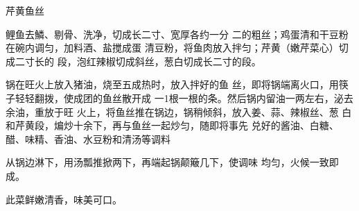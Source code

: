 \begin{recipe}{芹黄鱼丝}

\ingredients


\cooking

\step 	鲤鱼去鱗、剔骨、洗净，切成长二寸、宽厚各约一分 二的粗丝；鸡蛋清和干豆粉在碗内调匀，加料酒、盐搅成蛋 清豆粉，将鱼肉放入拌匀；芹黄（嫩芹菜心）切成二寸长的 段，泡红辣椒切成斜丝，葱白切成长二寸的段。

\step 	锅在旺火上放入猪油，烧至五成热时，放入拌好的鱼 丝，即将锅端离火口，用筷子轻轻翻拨，使成团的鱼丝散开成 一1根一根的条。然后锅内留油一两左右，泌去余油，重放于旺 火上，将鱼丝推在锅边，锅稍倾斜，放入姜、蒜、辣椒丝、葱 白和芹黄段，煸炒十余下，再与鱼丝一起炒匀，随即将事先 兑好的酱油、白糖、醋、味精、香油、水豆粉和清汤等调料

从锅边淋下，用汤瓢推掀两下，再端起锅颠簸几下，使调味 均匀，火候一致即成。

\notes

此菜鲜嫩清香，味美可口。

\end{recipe}

